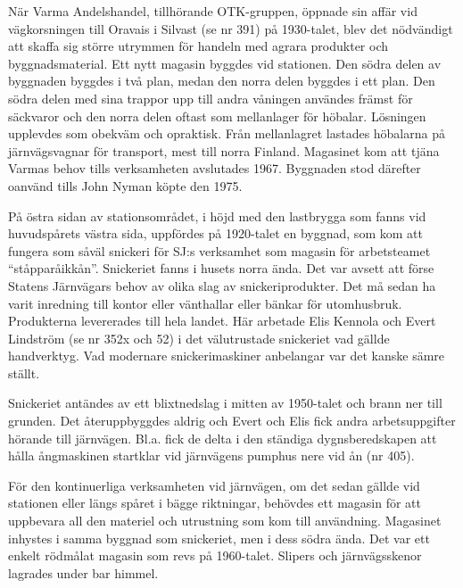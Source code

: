 När Varma Andelshandel, tillhörande OTK-gruppen, öppnade sin affär vid vägkorsningen till Oravais i Silvast (se nr 391) på 1930-talet, blev det nödvändigt att skaffa sig större utrymmen för handeln med agrara produkter och byggnadsmaterial. Ett nytt magasin byggdes vid stationen. Den södra delen av byggnaden byggdes i två plan, medan den norra delen byggdes i ett plan. Den södra delen med sina trappor upp till andra våningen användes främst för säckvaror och den norra delen oftast som mellanlager för höbalar. Lösningen upplevdes som obekväm och opraktisk. Från mellanlagret lastades höbalarna på järnvägsvagnar för transport, mest till norra Finland. Magasinet kom att tjäna Varmas behov tills verksamheten avslutades 1967. Byggnaden stod därefter oanvänd tills John Nyman köpte den 1975.




\jhnooccupant{}


På östra sidan av stationsområdet, i höjd med den lastbrygga som fanns vid huvudspårets västra sida, uppfördes på 1920-talet en byggnad, som kom att fungera som såväl snickeri för SJ:s verksamhet som magasin för arbetsteamet ``ståpparåikkån''. Snickeriet fanns i husets norra ända. Det var avsett att förse Statens Järnvägars behov av olika slag av snickeriprodukter. Det må sedan ha varit inredning till kontor eller vänthallar eller bänkar för utomhusbruk. Produkterna levererades till hela landet. Här arbetade Elis Kennola och Evert Lindström (se nr 352x och 52) i det välutrustade snickeriet vad gällde handverktyg. Vad modernare snickerimaskiner anbelangar var det kanske sämre ställt.

Snickeriet antändes av ett blixtnedslag i mitten av 1950-talet och brann ner till grunden. Det återuppbyggdes aldrig och Evert och Elis fick andra arbetsuppgifter hörande till järnvägen. Bl.a. fick de delta i den ständiga dygnsberedskapen att hålla ångmaskinen startklar vid järnvägens pumphus nere vid ån (nr 405).




\jhnooccupant{}


För den kontinuerliga verksamheten vid järnvägen, om det sedan gällde vid stationen eller längs spåret i bägge riktningar, behövdes ett magasin för att uppbevara all den materiel och utrustning som kom till användning. Magasinet inhystes i samma byggnad som snickeriet, men i dess södra ända. Det var ett enkelt rödmålat magasin som revs på 1960-talet. Slipers och järnvägsskenor lagrades under bar himmel.



